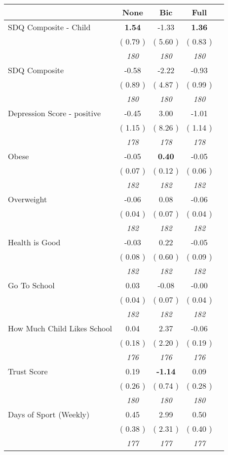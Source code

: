 \begin{tabular}{l c c c c}
\toprule
 & None & Bic & Full \\
\midrule
SDQ Composite - Child & \textbf{      1.54 } &     -1.33 & \textbf{      1.36 } \\
& (     0.79 ) & (     5.60 ) & (     0.83 ) \\
& \textit{ 180 } & \textit{ 180 } & \textit{ 180 } \\
SDQ Composite &     -0.58 &     -2.22 &     -0.93 \\
& (     0.89 ) & (     4.87 ) & (     0.99 ) \\
& \textit{ 180 } & \textit{ 180 } & \textit{ 180 } \\
Depression Score - positive &     -0.45 &      3.00 &     -1.01 \\
& (     1.15 ) & (     8.26 ) & (     1.14 ) \\
& \textit{ 178 } & \textit{ 178 } & \textit{ 178 } \\
Obese &     -0.05 & \textbf{      0.40 } &     -0.05 \\
& (     0.07 ) & (     0.12 ) & (     0.06 ) \\
& \textit{ 182 } & \textit{ 182 } & \textit{ 182 } \\
Overweight &     -0.06 &      0.08 &     -0.06 \\
& (     0.04 ) & (     0.07 ) & (     0.04 ) \\
& \textit{ 182 } & \textit{ 182 } & \textit{ 182 } \\
Health is Good &     -0.03 &      0.22 &     -0.05 \\
& (     0.08 ) & (     0.60 ) & (     0.09 ) \\
& \textit{ 182 } & \textit{ 182 } & \textit{ 182 } \\
Go To School &      0.03 &     -0.08 &     -0.00 \\
& (     0.04 ) & (     0.07 ) & (     0.04 ) \\
& \textit{ 182 } & \textit{ 182 } & \textit{ 182 } \\
How Much Child Likes School &      0.04 &      2.37 &     -0.06 \\
& (     0.18 ) & (     2.20 ) & (     0.19 ) \\
& \textit{ 176 } & \textit{ 176 } & \textit{ 176 } \\
Trust Score &      0.19 & \textbf{     -1.14 } &      0.09 \\
& (     0.26 ) & (     0.74 ) & (     0.28 ) \\
& \textit{ 180 } & \textit{ 180 } & \textit{ 180 } \\
Days of Sport (Weekly) &      0.45 &      2.99 &      0.50 \\
& (     0.38 ) & (     2.31 ) & (     0.40 ) \\
& \textit{ 177 } & \textit{ 177 } & \textit{ 177 } \\
\bottomrule
\end{tabular}
